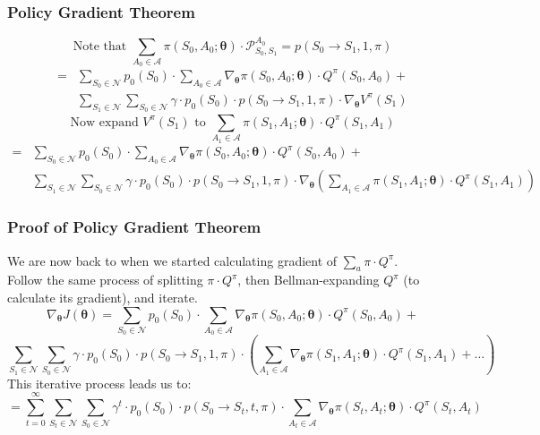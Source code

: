 \documentclass[handout]{beamer}
\begin{document}
\begin{frame}
\frametitle{Policy Gradient Theorem}
\pause
$$\text{Note that } \sum_{A_0 \in \mathcal{A}} \pi(S_0, A_0; \bm{\theta}) \cdot \mathcal{P}_{S_0,S_1}^{A_0} = p(S_0 \rightarrow S_1, 1, \pi)$$
\pause
\begin{align*}
= & \sum_{S_0 \in \mathcal{N}} p_0(S_0) \cdot \sum_{A_0 \in \mathcal{A}} \nabla_{\bm{\theta}} \pi(S_0, A_0; \bm{\theta}) \cdot Q^{\pi}(S_0, A_0) + \\
& \sum_{S_1 \in \mathcal{N}}  \sum_{S_0 \in \mathcal{N}} \gamma \cdot p_0(S_0) \cdot p(S_0 \rightarrow S_1, 1, \pi) \cdot \nabla_{\bm{\theta}}V^{\pi}(S_1)
\end{align*}
\pause
$$\text{Now expand } V^{\pi}(S_1) \text{ to } \sum_{A_1 \in \mathcal{A}} \pi(S_1, A_1; \bm{\theta}) \cdot Q^{\pi}(S_1,A_1)$$
\pause
\begin{align*}
= & \sum_{S_0 \in \mathcal{N}} p_0(S_0) \cdot \sum_{A_0 \in \mathcal{A}} \nabla_{\bm{\theta}} \pi(S_0, A_0; \bm{\theta}) \cdot Q^{\pi}(S_0, A_0) + \\
& \sum_{S_1 \in \mathcal{N}}  \sum_{S_0 \in \mathcal{N}} \gamma \cdot p_0(S_0) \cdot p(S_0 \rightarrow S_1, 1, \pi) \cdot \nabla_{\bm{\theta}} (\sum_{A_1 \in \mathcal{A}} \pi(S_1, A_1; \bm{\theta}) \cdot Q^{\pi}(S_1,A_1)) 
\end{align*}
\end{frame}

\begin{frame}
\frametitle{Proof of Policy Gradient Theorem}
\pause
We are now back to when we started calculating gradient of $\sum_a \pi \cdot Q^{\pi}$.\\
\pause
Follow the same process of splitting $\pi \cdot Q^{\pi}$, then Bellman-expanding $Q^{\pi}$ (to calculate its gradient), and iterate.
\pause
$$\nabla_{\bm{\theta}} J(\bm{\theta}) = \sum_{S_0 \in \mathcal{N}} p_0(S_0) \cdot \sum_{A_0 \in \mathcal{A}} \nabla_{\bm{\theta}} \pi(S_0, A_0; \bm{\theta}) \cdot Q^{\pi}(S_0, A_0) + $$
$$\sum_{S_1 \in \mathcal{N}} \sum_{S_0 \in \mathcal{N}} \gamma \cdot p_0(S_0) \cdot p(S_0 \rightarrow S_1, 1, \pi) \cdot  (\sum_{A_1 \in \mathcal{A}} \nabla_{\bm{\theta}} \pi(S_1, A_1; \bm{\theta}) \cdot Q^{\pi}(S_1,A_1) + \ldots)$$
\pause
This iterative process leads us to:
$$= \sum_{t=0}^\infty \sum_{S_t \in \mathcal{N}} \sum_{S_0 \in \mathcal{N}} \gamma^t \cdot p_0(S_0) \cdot p(S_0 \rightarrow S_t, t, \pi) \cdot \sum_{A_t \in \mathcal{A}} \nabla_{\bm{\theta}} \pi(S_t, A_t; \bm{\theta}) \cdot Q^{\pi}(S_t,A_t)$$
\end{frame}
\end{document}
